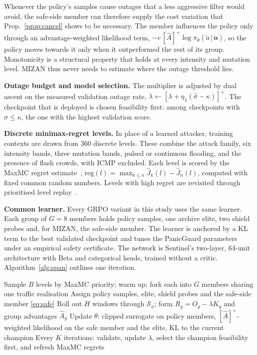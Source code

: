 \documentclass[conference]{IEEEtran}
\begin{document}
Whenever the policy's samples cause outages that a less aggressive filter would avoid, the safe-side member can therefore supply the cost variation that Prop.~\ref{prop:cancel} shows to be necessary. The member influences the policy only through an advantage-weighted likelihood term, $-c\,[\hat A]^+\log\pi_\theta(\tilde a\,|\,\mathbf{o})$, so the policy moves towards it only when it outperformed the rest of its group. Monotonicity is a structural property that holds at every intensity and mutation level. MIZAN thus never needs to estimate where the outage threshold lies.

\textbf{Outage budget and model selection.} The multiplier is adjusted by dual ascent on the measured validation outage rate, $\lambda\leftarrow[\lambda+\eta_\lambda(\hat\sigma-\kappa)]^+$. The checkpoint that is deployed is chosen feasibility first: among checkpoints with $\hat\sigma\le\kappa$, the one with the highest validation score.

\textbf{Discrete minimax-regret levels.} In place of a learned attacker, training contexts are drawn from 360 discrete levels. These combine the attack family, six intensity bands, three mutation bands, pulsed or continuous flooding, and the presence of flash crowds, with ICMP excluded. Each level is scored by the MaxMC regret estimate~\cite{jiang2021robustplr}, $\mathrm{reg}(l)=\max_{k\le n}\hat J_k(l)-\hat J_n(l)$, computed with fixed common random numbers. Levels with high regret are revisited through prioritised level replay~\cite{jiang2021plr}.

\textbf{Common learner.} Every GRPO variant in this study uses the same learner. Each group of $G=8$ members holds policy samples, one archive elite, two shield probes and, for MIZAN, the safe-side member. The learner is anchored by a KL term to the best validated checkpoint and tunes the PanicGuard parameters under an empirical safety certificate. The network is Sentinel's two-layer, 64-unit architecture with Beta and categorical heads, trained without a critic. Algorithm~\ref{alg:span} outlines one iteration.

\begin{algorithm}[t]
\caption{One MIZAN training iteration}
\label{alg:span}
\small
\begin{algorithmic}[1]
\STATE Sample $B$ levels by MaxMC priority; warm up; fork each into $G$ members sharing one traffic realisation
\STATE Assign policy samples, elite, shield probes and the safe-side member \eqref{eq:safe}
\STATE Roll out $H$ windows through $\mathcal{S}_\phi$; form $R_g=O_g-\lambda K_g$ and group advantages $\hat A_g$
\STATE Update $\theta$: clipped surrogate on policy members, $[\hat A]^+$-weighted likelihood on the safe member and the elite, KL to the current champion
\STATE Every $K$ iterations: validate, update $\lambda$, select the champion feasibility first, and refresh MaxMC regrets
\end{algorithmic}
\end{algorithm}
\end{document}
